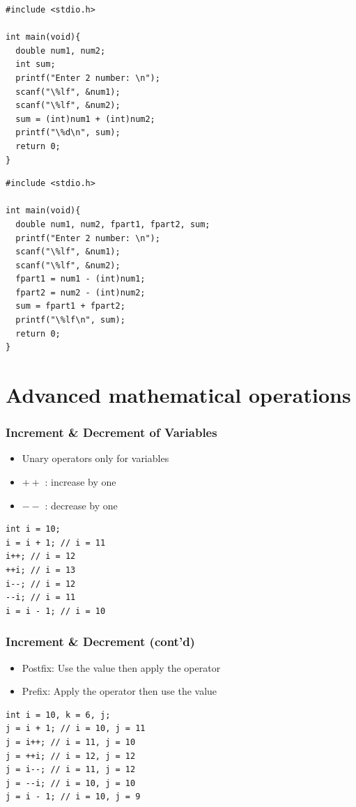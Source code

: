 \documentclass{../c-lecture}
\begin{document}
\begin{frame}[fragile]
  \begin{verbatim}
#include <stdio.h>

int main(void){
  double num1, num2;
  int sum;
  printf("Enter 2 number: \n");
  scanf("\%lf", &num1);
  scanf("\%lf", &num2);
  sum = (int)num1 + (int)num2;
  printf("\%d\n", sum);
  return 0;
}
  \end{verbatim}
\end{frame}

\begin{frame}[fragile]
  \begin{verbatim}
#include <stdio.h>

int main(void){
  double num1, num2, fpart1, fpart2, sum;
  printf("Enter 2 number: \n");
  scanf("\%lf", &num1);
  scanf("\%lf", &num2);
  fpart1 = num1 - (int)num1;
  fpart2 = num2 - (int)num2;
  sum = fpart1 + fpart2;
  printf("\%lf\n", sum);
  return 0;
}
  \end{verbatim}
\end{frame}

\section{Advanced mathematical operations}

\begin{frame}[fragile]
  \frametitle{Increment \& Decrement of Variables}
  \begin{itemize}
    \item Unary operators only for variables
    \item $++$ : increase by one
    \item $--$ : decrease by one
  \end{itemize}
  \begin{verbatim}
int i = 10;
i = i + 1; // i = 11
i++; // i = 12
++i; // i = 13
i--; // i = 12
--i; // i = 11
i = i - 1; // i = 10
  \end{verbatim}
\end{frame}

\begin{frame}[fragile]
  \frametitle{Increment \& Decrement (cont’d)}
  \begin{itemize}
    \item
      {\color{Cyan} Postfix:} Use the value then apply the
      operator
    \item
      {\color{Cyan} Prefix:} Apply the operator then use the value
  \end{itemize}
  \begin{verbatim}
int i = 10, k = 6, j;
j = i + 1; // i = 10, j = 11
j = i++; // i = 11, j = 10
j = ++i; // i = 12, j = 12
j = i--; // i = 11, j = 12
j = --i; // i = 10, j = 10
j = i - 1; // i = 10, j = 9
  \end{verbatim}
\end{frame}
\end{document}
